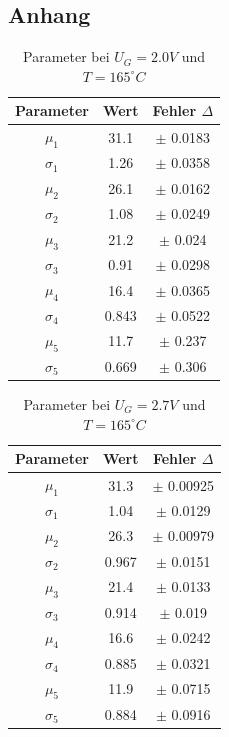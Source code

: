 \documentclass{article}
\begin{document}
\begin{multicols}{2}
\clearpage
\section{Anhang}
\begin{table}[H]
  \centering
  \begin{tabular}{|c|c|c|}
      \hline
      Parameter & Wert & Fehler $\Delta$ \\ \hline
      $\mu_1$ & 31.1 & $\pm$ 0.0183 \\ \hline
      $\sigma_1$& 1.26 & $\pm$ 0.0358 \\ \hline
      $\mu_2$ & 26.1 & $\pm$ 0.0162 \\ \hline
      $\sigma_2$ & 1.08 & $\pm$ 0.0249 \\ \hline
      $\mu_3$ & 21.2 & $\pm$ 0.024 \\ \hline
      $\sigma_3$ & 0.91 & $\pm$ 0.0298 \\ \hline
      $\mu_4$ & 16.4 & $\pm$ 0.0365 \\ \hline
      $\sigma_4$ & 0.843 & $\pm$ 0.0522 \\ \hline
      $\mu_5$ & 11.7 & $\pm$ 0.237 \\ \hline
      $\sigma_5$ & 0.669 & $\pm$ 0.306 \\ \hline
  \end{tabular}
  \caption{Parameter bei $U_G=2.0V$ und $T=165^\circ C$}
  \label{tab:data_no_height}
\end{table}
\begin{table}[H]
  \centering
  \begin{tabular}{|c|c|c|}
      \hline
      Parameter & Wert & Fehler $\Delta$ \\ \hline
      $\mu_1$ & 31.3 & $\pm$ 0.00925 \\ \hline
      $\sigma_1$ & 1.04 & $\pm$ 0.0129 \\ \hline
      $\mu_2$ & 26.3 & $\pm$ 0.00979 \\ \hline
      $\sigma_2$ & 0.967 & $\pm$ 0.0151 \\ \hline
      $\mu_3$ & 21.4 & $\pm$ 0.0133 \\ \hline
      $\sigma_3$ & 0.914 & $\pm$ 0.019 \\ \hline
      $\mu_4$ & 16.6 & $\pm$ 0.0242 \\ \hline
      $\sigma_4$ & 0.885 & $\pm$ 0.0321 \\ \hline
      $\mu_5$ & 11.9 & $\pm$ 0.0715 \\ \hline
      $\sigma_5$ & 0.884 & $\pm$ 0.0916 \\ \hline
  \end{tabular}
  \caption{Parameter bei $U_G=2.7V$ und $T=165^\circ C$}
  \label{tab:data_no_height_2}
\end{table}


\end{multicols}
\end{document}
